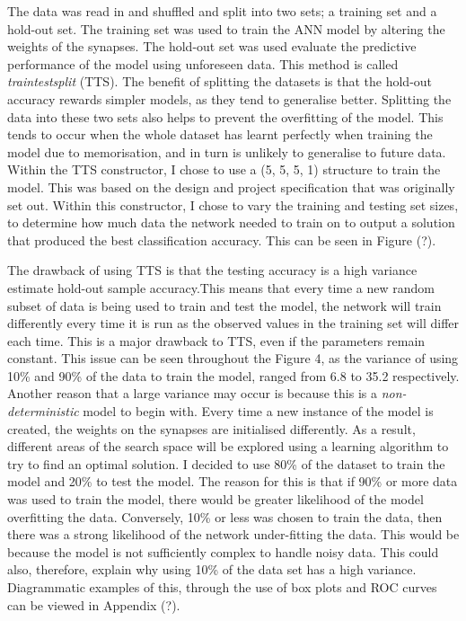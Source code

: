 \documentclass[11pt]{article}
\begin{document}
The data was read in and shuffled and split into two sets;  a training set and a hold-out set. The training set was used to train the ANN model by altering the weights of the synapses. The hold-out set was used evaluate the predictive performance of the model using unforeseen data. This method is called \textit{train\textunderscore test\textunderscore split} (TTS). The benefit of splitting the datasets is that the hold-out accuracy rewards simpler models, as they tend to generalise better. Splitting the data into these two sets also helps to prevent the overfitting of the model. This tends to occur when the whole dataset has learnt perfectly when training the model due to memorisation, and in turn is unlikely to generalise to future data.
Within the TTS constructor, I chose to use a (5, 5, 5, 1) structure to train the model. This was based on the design and project specification that was originally set out. Within this constructor, I chose to vary the training and testing set sizes, to determine how much data the network needed to train on to output a solution that produced the best classification accuracy. This can be seen in Figure (?). 

The drawback of using TTS is that the testing accuracy is a high variance estimate hold-out sample accuracy.This means that every time a new random subset  of data is being used to train and test the model,  the network will train differently every time it is run as the observed values in the training set will differ each time. This is a major drawback to TTS, even if the parameters remain constant. 
This issue can be seen throughout the Figure 4, as the variance of using 10\% and  90\% of the data to train the model, ranged from 6.8 to 35.2 respectively.  Another reason that a large variance may occur is because this is a \textit{non-deterministic} model to begin with. Every time a new instance of the model is created, the weights on the synapses are initialised differently. As a result, different areas of the search space will be explored using a learning algorithm to try to find an optimal solution. 
I decided to use 80\% of the dataset to train the model and 20\% to test the model. The reason for this is that if 90\% or more data was used to train the model, there would be greater likelihood of the model overfitting the data. Conversely, 10\% or less was chosen to train the data, then there was a strong likelihood of the network under-fitting the data. This would be because the model is not sufficiently complex to handle noisy data. This could also, therefore, explain why using 10\% of the data set has a high variance. Diagrammatic examples of this, through the use of box plots and ROC curves can be viewed in Appendix (?). 
\end{document}
